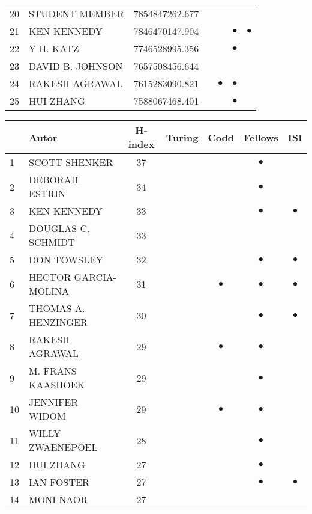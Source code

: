 \documentclass[12pt,titlepage]{report}
\begin{document}
\begin{center}
\begin{tabular}{|l|l|c|c|c|c|c|}
20 & STUDENT MEMBER & 7854847262.677     & &         &         &         \\
21 & KEN KENNEDY & 7846470147.904        & &         &$\bullet$&$\bullet$\\
22 & Y H. KATZ & 7746528995.356          & &         &$\bullet$&         \\
23 & DAVID B. JOHNSON & 7657508456.644   & &         &         &         \\
24 & RAKESH AGRAWAL & 7615283090.821     & &$\bullet$&$\bullet$&         \\
25 & HUI ZHANG & 7588067468.401          & &         &$\bullet$&         \\
\hline
\end{tabular}
\end{center}


\begin{center}
\begin{tabular}{|l|l|c|c|c|c|c|}
\hline
& {\bf Autor} & {\bf H-index} & {\bf Turing} & {\bf Codd} & {\bf Fellows} & {\bf ISI} \\
\hline
1  & SCOTT SHENKER & 37        & &         &$\bullet$&         \\
2  & DEBORAH ESTRIN & 34       & &         &$\bullet$&         \\
3  & KEN KENNEDY & 33          & &         &$\bullet$&$\bullet$\\
4  & DOUGLAS C. SCHMIDT & 33   & &         &         &         \\
5  & DON TOWSLEY & 32          & &         &$\bullet$&$\bullet$\\
6  & HECTOR GARCIA-MOLINA & 31 & &$\bullet$&$\bullet$&$\bullet$\\
7  & THOMAS A. HENZINGER & 30  & &         &$\bullet$&$\bullet$\\
8  & RAKESH AGRAWAL & 29       & &$\bullet$&$\bullet$&         \\
9  & M. FRANS KAASHOEK & 29    & &         &$\bullet$&         \\
10 & JENNIFER WIDOM & 29       & &$\bullet$&$\bullet$&         \\
11 & WILLY ZWAENEPOEL & 28     & &         &$\bullet$&         \\
12 & HUI ZHANG & 27            & &         &$\bullet$&         \\
13 & IAN FOSTER & 27           & &         &$\bullet$&$\bullet$\\
14 & MONI NAOR & 27            & &         &         &         \\

\end{tabular}
\end{center}
\end{document}
